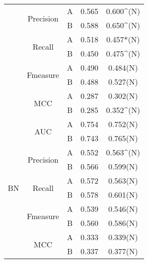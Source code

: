 \begin{table}[t!]
{\begin{tabular}{|c|c|c|c|c|}
                      & \multirow{2}{*}{Precision} & A & 0.565 & 0.600\textasciicircum{}(N)   \\ \cline{3-5} 
                      &                            & B & 0.588 & 0.650\textasciicircum{}(N)  \\ \cline{2-5} 
                      & \multirow{2}{*}{Recall}    & A & 0.518 & 0.457*(N)                  \\ \cline{3-5} 
                      &                            & B & 0.450  & 0.475\textasciicircum{}(N) \\ \cline{2-5} 
                      & \multirow{2}{*}{Fmeasure}  & A & 0.490  & 0.484(N)                   \\ \cline{3-5} 
                      &                            & B & 0.488 & 0.527(N)                   \\ \cline{2-5} 
                      & \multirow{2}{*}{MCC}       & A & 0.287 & 0.302(N)                   \\ \cline{3-5} 
                      &                            & B & 0.285 & 0.352\textasciicircum{}(N) \\ \hline
\multirow{10}{*}{BN}  & \multirow{2}{*}{AUC}       & A & 0.754 & 0.752(N)                   \\ \cline{3-5} 
                      &                            & B & 0.743 & 0.765(N)                   \\ \cline{2-5} 
                      & \multirow{2}{*}{Precision} & A & 0.552 & 0.563\textasciicircum{}(N) \\ \cline{3-5} 
                      &                            & B & 0.566 & 0.599(N)                   \\ \cline{2-5} 
                      & \multirow{2}{*}{Recall}    & A & 0.572 & 0.563(N)                   \\ \cline{3-5} 
                      &                            & B & 0.578 & 0.601(N)                   \\ \cline{2-5} 
                      & \multirow{2}{*}{Fmeasure}  & A & 0.539 & 0.546(N)                   \\ \cline{3-5} 
                      &                            & B & 0.560  & 0.586(N)                   \\ \cline{2-5} 
                      & \multirow{2}{*}{MCC}       & A & 0.333 & 0.339(N)                   \\ \cline{3-5} 
                      &                            & B & 0.337 & 0.377(N)                   \\ \hline

\end{tabular}}
\end{table}

